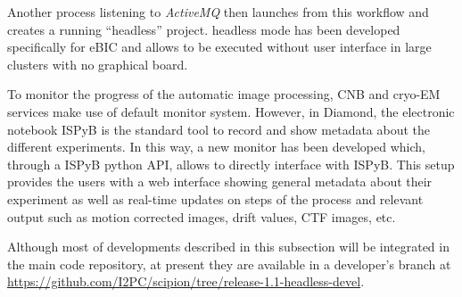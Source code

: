 Another process listening to \emph{ActiveMQ} then launches \scipion from this workflow and creates a running ``headless'' project. \scipion headless mode has been developed specifically for eBIC and allows \scipion to be executed without user interface in large clusters with no graphical board. 



To monitor the progress of the automatic image processing, CNB and \scilifelab cryo-EM services make use of \scipion default monitor system. However, in Diamond, the electronic notebook ISPyB is the standard tool to record and show metadata about the different experiments. In this way, a new monitor has been developed which, through a ISPyB python API, allows \scipion to directly interface with ISPyB.  This setup provides the users with a web interface showing general metadata about their experiment as well as  real-time updates on steps of the process and relevant output such as motion corrected images, drift values, CTF images, etc.

Although most of developments described in this subsection will be integrated in the main \scipion code repository, at present they are available in a developer's branch  at \url{https://github.com/I2PC/scipion/tree/release-1.1-headless-devel}.
